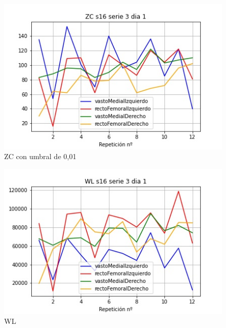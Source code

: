 \begin{figure}[ht]
	\centering
  \includegraphics[width=1.0\textwidth]{imagenes/caracteristicas/ZC s16 serie 3 dia 1.jpg}
  \caption{ ZC con umbral de 0,01}
  \label{fig:zc}
\end{figure}


\begin{figure}[ht]
	\centering
  \includegraphics[width=1.0\textwidth]{imagenes/caracteristicas/WL s16 serie 3 dia 1.jpg}
  \caption{ WL}
  \label{fig:wl}
\end{figure}



